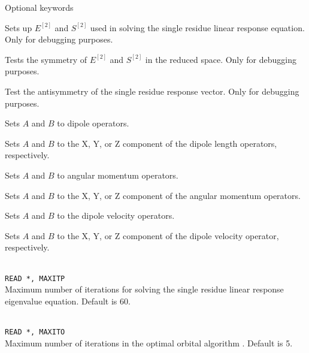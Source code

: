 Optional keywords

\begin{description}

\item{} Sets up $E^{\left[2\right]}$
  and $S^{\left[2\right]}$ used in solving the
  single residue linear response equation. Only for debugging purposes.

\item{} Tests the symmetry of $E^{\left[2\right]}$
  and $S^{\left[2\right]}$ in the reduced space.
  Only for debugging purposes.

\item{} Test the antisymmetry of the single residue response
  vector. Only for debugging purposes.

\item{}
Sets $A$ and $B$ to dipole operators.

\item{}
Sets $A$ and $B$ to the X, Y, or Z component of the dipole length operators, respectively.

\item{}
Sets $A$ and $B$ to angular momentum operators.

\item{}
Sets $A$ and $B$ to the X, Y, or Z component of the angular momentum operators.

\item{}
Sets $A$ and $B$ to the dipole velocity operators.

\item{}
Sets $A$ and $B$ to the X, Y, or Z component of the dipole velocity
operator, respectively.

\item{}\\
\verb|READ *, MAXITP|\\
Maximum number of iterations for solving the single residue
linear response eigenvalue equation. Default is 60.

\item{}\\
\verb|READ *, MAXITO|\\
Maximum number of iterations in the optimal orbital
algorithm
\cite{tuhjahjajpjjcp84}. 
Default is 5.


\end{description}
